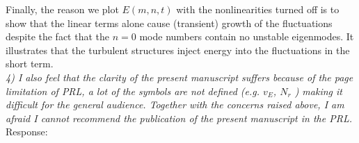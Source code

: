 \documentclass[12pt]{article}
\begin{document}
Finally, the reason we plot $E(m,n,t)$ with the nonlinearities turned off is to show that the linear terms alone cause (transient) growth of the fluctuations despite the fact that the $n=0$ mode numbers contain no unstable eigenmodes. It illustrates that the turbulent structures inject energy into the fluctuations in the short term. \\


\emph{4) I also feel that the clarity of the present manuscript suffers because of the page limitation of
PRL, a lot of the symbols are not defined (e.g. $v_E$, $N_r$ ) making it difficult for the general audience.
Together with the concerns raised above, I am afraid I cannot recommend the publication of the
present manuscript in the PRL.} \\


Response: \\





%
%
\end{document}
